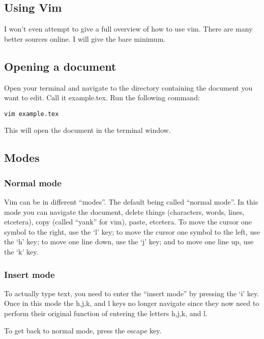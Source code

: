 \documentclass{amsart}
\begin{document}
\subsection{Using Vim}

I won't even attempt to give a full overview of how to use vim. There are many better
sources online. 
I will give the bare minimum. 

\subsection{Opening a document}

Open your terminal and navigate to the directory containing the document you want to edit.
Call it example.tex. 
Run the following command:
\begin{center}
\begin{verbatim}
vim example.tex
\end{verbatim}
\end{center}
This will open the document in the terminal window. 

\subsection{Modes}

\subsubsection{Normal mode}

Vim can be in different 
``modes''. The default being called ``normal mode''. In this mode you can navigate the
document, delete things (characters, words, lines, etcetera), copy (called ``yank'' for vim),
paste, etcetera. To move the cursor one symbol to the right, use the `l' key; to move the
cursor one symbol to the left, use the `h' key; to move one line down, use the `j' key;
and to move one line up, use the `k' key. 

\subsubsection{Insert mode}

To actually type text, you need to enter the 
``insert mode'' by pressing the `i' key. Once in this mode the h,j,k, and l keys no longer
navigate since they now need to perform their original function of entering the letters
h,j,k, and l. 

To get back to normal mode, press the escape key. 
\end{document}
